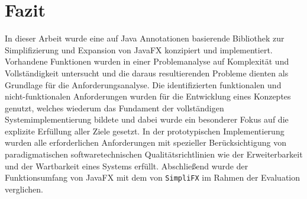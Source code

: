 \chapter{Fazit}
\label{fazit}
In dieser Arbeit wurde eine auf Java Annotationen basierende Bibliothek zur Simplifizierung und Expansion von JavaFX konzipiert und implementiert. Vorhandene Funktionen wurden in einer Problemanalyse auf Komplexität und Vollständigkeit untersucht und die daraus resultierenden Probleme dienten als Grundlage für die Anforderungsanalyse. Die identifizierten funktionalen und nicht-funktionalen Anforderungen wurden für die Entwicklung eines Konzeptes genutzt, welches wiederum das Fundament der vollständigen Systemimplementierung bildete und dabei wurde ein besonderer Fokus auf die explizite Erfüllung aller Ziele gesetzt. In der prototypischen Implementierung wurden alle erforderlichen Anforderungen mit spezieller Berücksichtigung von paradigmatischen softwaretechnischen Qualitätsrichtlinien wie der Erweiterbarkeit und der Wartbarkeit eines Systems erfüllt. Abschließend wurde der Funktionsumfang von JavaFX mit dem von \texttt{SimpliFX} im Rahmen der Evaluation verglichen. 

